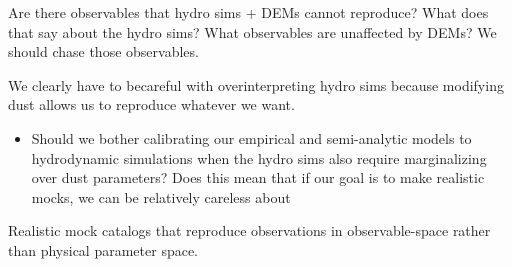 Are there observables that hydro sims + DEMs cannot reproduce? What does that say about the hydro sims?
What observables are unaffected by DEMs? We should chase those observables. 

We clearly have to becareful with overinterpreting hydro sims because modifying
dust allows us to reproduce whatever we want. 
\begin{itemize}
    \item Should we bother calibrating our empirical and semi-analytic models
        to hydrodynamic simulations when the hydro sims also require
        marginalizing over dust parameters? Does this mean that if our goal is
        to make realistic mocks, we can be relatively careless about 
\end{itemize}

Realistic mock catalogs that reproduce observations in observable-space rather
than physical parameter space.   
